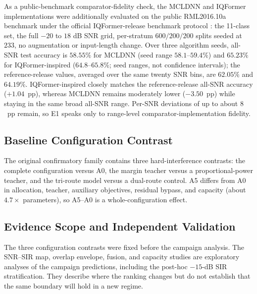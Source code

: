 \documentclass[letterpaper,journal]{IEEEtran}
\begin{document}
As a public-benchmark comparator-fidelity check, the MCLDNN and IQFormer
implementations were additionally evaluated on the public RML2016.10a benchmark
\cite{oshea2016cnn} under the official IQFormer-release benchmark protocol
\cite{shao2025iqformercode}: the 11-class set, the
full $-20$ to $18$ dB SNR grid, per-stratum $600/200/200$ splits seeded at
$233$, no augmentation or input-length change. Over three algorithm seeds,
all-SNR test accuracy is $58.55\%$ for MCLDNN (seed range
$58.1$--$59.4\%$) and $65.23\%$ for IQFormer-inspired ($64.8$--$65.8\%$;
seed ranges, not confidence intervals); the reference-release values,
averaged over the same twenty SNR bins, are $62.05\%$ and $64.19\%$.
IQFormer-inspired closely matches the
reference-release all-SNR accuracy ($+1.04$~pp), whereas MCLDNN remains
moderately lower ($-3.50$~pp) while staying in the same
broad all-SNR range. Per-SNR deviations of up to about $8$~pp remain, so E1
speaks only to range-level comparator-implementation fidelity.

\subsection{Baseline Configuration Contrast}
The original confirmatory family contains three hard-interference contrasts:
the complete
configuration versus A0, the margin teacher versus a proportional-power
teacher, and the tri-route model versus a dual-route control. A5 differs from
A0 in allocation, teacher, auxiliary objectives, residual bypass, and capacity
(about $4.7\times$ parameters), so A5--A0 is a whole-configuration
effect.

\subsection{Evidence Scope and Independent Validation}
The three configuration contrasts were fixed before the campaign analysis.
The SNR--SIR map, overlap envelope, fusion, and capacity studies are
exploratory analyses of the campaign predictions, including the post-hoc
$-15$-dB SIR stratification. They describe where the ranking changes but do not
establish that the same boundary will hold in a new regime.
\end{document}
